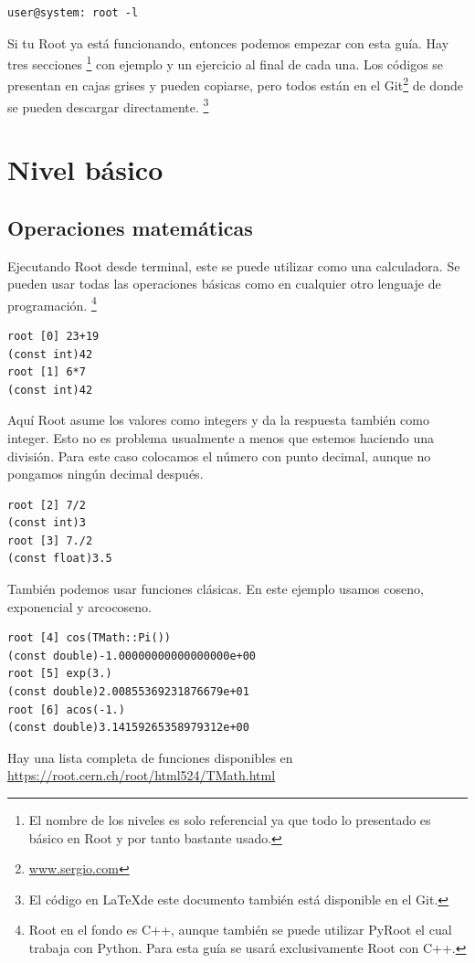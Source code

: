 \documentclass{article}
\begin{document}
\begin{tcolorbox} [breakable]
\begin{verbatim}
user@system: root -l
\end{verbatim}
\end{tcolorbox}

Si tu Root ya est\'a funcionando, entonces podemos empezar con esta gu\'ia. Hay tres secciones \footnote{El nombre de los niveles es solo referencial ya que todo lo presentado es b\'asico en Root y por tanto bastante usado.} con ejemplo y un ejercicio al final de cada una. Los c\'odigos se presentan en cajas grises y pueden copiarse, pero todos est\'an en el Git\footnote{\url{www.sergio.com}} de donde se pueden descargar directamente. \footnote{El c\'odigo en \LaTeX de este documento tambi\'en est\'a disponible en el Git.}
\newpage
\section{Nivel b\'asico}
\subsection{Operaciones matem\'aticas}
Ejecutando Root desde terminal, este se puede utilizar como una calculadora. Se pueden usar todas las operaciones b\'asicas como en cualquier otro lenguaje de programaci\'on. \footnote{Root en el fondo es C++, aunque tambi\'en se puede utilizar PyRoot el cual trabaja con Python. Para esta gu\'ia se usar\'a exclusivamente Root con C++.}
\begin{tcolorbox} [breakable]
\begin{verbatim}
root [0] 23+19
(const int)42
root [1] 6*7
(const int)42
\end{verbatim}
\end{tcolorbox}
Aqu\'i Root asume los valores como integers y da la respuesta tambi\'en como integer. Esto no es problema usualmente a menos que estemos haciendo una divisi\'on. Para este caso colocamos el n\'umero con punto decimal, aunque no pongamos ning\'un decimal despu\'es.
\begin{tcolorbox} [breakable]
\begin{verbatim}
root [2] 7/2
(const int)3
root [3] 7./2
(const float)3.5
\end{verbatim}
\end{tcolorbox}
Tambi\'en podemos usar funciones cl\'asicas. En este ejemplo usamos coseno, exponencial y arcocoseno.
\begin{tcolorbox} [breakable]
\begin{verbatim}
root [4] cos(TMath::Pi())
(const double)-1.00000000000000000e+00
root [5] exp(3.)
(const double)2.00855369231876679e+01
root [6] acos(-1.)
(const double)3.14159265358979312e+00
\end{verbatim}
\end{tcolorbox}
Hay una lista completa de funciones disponibles en \url{https://root.cern.ch/root/html524/TMath.html}
\end{document}
